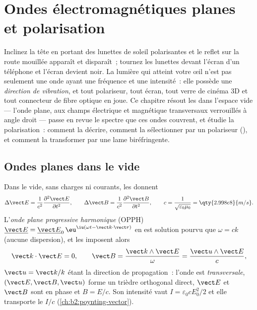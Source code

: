 \chapter{Ondes électromagnétiques planes et polarisation}\label{ch:b2:plane-waves-polarization}

Inclinez la tête en portant des lunettes de soleil polarisantes et le reflet sur la
route mouillée apparaît et disparaît~; tournez les lunettes devant l'écran d'un téléphone
et l'écran devient noir. La lumière qui atteint votre œil n'est pas seulement
une onde ayant une fréquence et une intensité~: elle possède une \emph{direction de
vibration}, et tout polariseur, tout écran, tout verre de cinéma 3D et tout connecteur de
fibre optique en joue. Ce chapitre résout les 
dans l'espace vide --- l'onde plane, aux champs électrique et magnétique
transversaux verrouillés à angle droit --- passe en revue le spectre que ces
ondes couvrent, et étudie la polarisation~: comment la décrire, comment la
sélectionner par un polariseur (), et comment la transformer par une
lame biréfringente.

\section{Ondes planes dans le vide}

\begin{theorem}\label{thm:b2:plane-waves-polarization:wave}
Dans le vide, sans charges ni courants, les  donnent
\[
\Delta\vect E = \frac1{c^2}\frac{\partial^2\vect E}{\partial t^2} , \qquad
\Delta\vect B = \frac1{c^2}\frac{\partial^2\vect B}{\partial t^2} , \qquad
c = \frac1{\sqrt{\varepsilon_0\mu_0}} = \qty{2.998e8}{m/s} .
\]
L'\emph{onde plane progressive harmonique} (OPPH) $\underline{\vect E} =
\underline{\vect E}_0\,\eu^{\iu(\omega t - \vect k\cdot\vect r)}$ en est solution pourvu que
$\omega = ck$ (aucune dispersion), et les  imposent alors
\[
\vect k\cdot\vect E = 0 , \qquad
\vect B = \frac{\vect k\wedge\vect E}\omega = \frac{\vect u\wedge\vect E}c ,
\]
$\vect u = \vect k/k$ étant la direction de propagation~: l'onde est
\emph{transversale}, $(\vect E, \vect B, \vect u)$ forme un trièdre orthogonal
direct, $\vect E$ et $\vect B$ sont en phase et $B = E/c$. Son intensité vaut
$I = \varepsilon_0cE_0^2/2$ et elle transporte le  $I/c$
(\cref{ch:b2:poynting-vector}).
\end{theorem}

